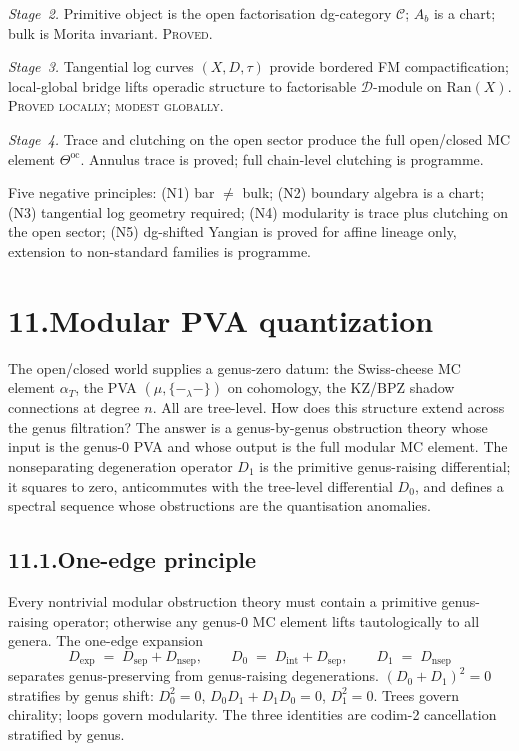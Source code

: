 \documentclass[11pt]{report}
\theoremstyle{definition}
\theoremstyle{remark}
\providecommand{\cC}{\mathcal{C}}
\providecommand{\cD}{\mathcal{D}}
\providecommand{\Ran}{\mathrm{Ran}}
\providecommand{\nsep}{\mathrm{nsep}}
\providecommand{\oc}{\mathrm{oc}}
\providecommand{\sep}{\mathrm{sep}}
\numberwithin{equation}{section}
\begin{document}
\emph{Stage~2.} Primitive object is the open factorisation
dg-category $\cC$; $A_b$ is a chart; bulk is Morita invariant.
\textsc{Proved.}

\emph{Stage~3.} Tangential log curves $(X, D, \tau)$ provide
bordered FM compactification; local-global bridge lifts
operadic structure to factorisable $\cD$-module on $\Ran(X)$.
\textsc{Proved locally; modest globally.}

\emph{Stage~4.} Trace and clutching on the open sector produce
the full open/closed MC element $\Theta^{\oc}$. Annulus trace
is proved; full chain-level clutching is programme.

Five negative principles: (N1) bar $\neq$ bulk; (N2) boundary
algebra is a chart; (N3) tangential log geometry required;
(N4) modularity is trace plus clutching on the open sector;
(N5) dg-shifted Yangian is proved for affine lineage only,
extension to non-standard families is programme.


\section*{11.\quad Modular PVA quantization}

The open/closed world supplies a genus-zero datum: the
Swiss-cheese MC element $\alpha_T$, the PVA
$(\mu, \{-_\lambda -\})$ on cohomology, the KZ/BPZ shadow
connections at degree $n$. All are tree-level. How does this
structure extend across the genus filtration? The answer is
a genus-by-genus obstruction theory whose input is the genus-$0$
PVA and whose output is the full modular MC element. The
nonseparating degeneration operator $D_1$ is the primitive
genus-raising differential; it squares to zero, anticommutes
with the tree-level differential $D_0$, and defines a spectral
sequence whose obstructions are the quantisation anomalies.

\subsection*{11.1.\enspace One-edge principle}

Every nontrivial modular obstruction theory must contain a
primitive genus-raising operator; otherwise any genus-$0$ MC
element lifts tautologically to all genera. The one-edge
expansion
\[
D_{\exp} \;=\; D_{\sep} + D_{\nsep},
\qquad
D_0 \;=\; D_{\mathrm{int}} + D_{\sep},
\qquad
D_1 \;=\; D_{\nsep}
\]
separates genus-preserving from genus-raising degenerations.
$(D_0 + D_1)^2 = 0$ stratifies by genus shift:
$D_0^2 = 0$, $D_0 D_1 + D_1 D_0 = 0$, $D_1^2 = 0$. Trees
govern chirality; loops govern modularity. The three
identities are codim-2 cancellation stratified by genus.
\end{document}
